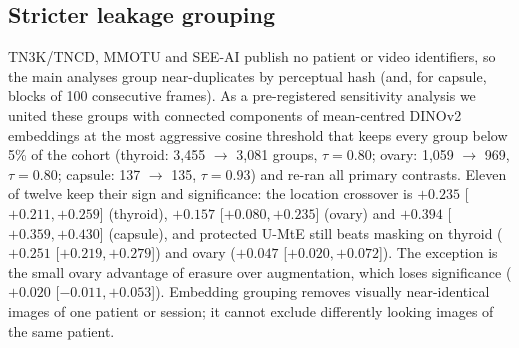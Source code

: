 \subsection{Stricter leakage grouping}\label{sec:leak_emb}
TN3K/TNCD, MMOTU and SEE-AI publish no patient or video identifiers, so the main analyses group near-duplicates by
perceptual hash (and, for capsule, blocks of 100 consecutive frames). As a pre-registered sensitivity analysis we
united these groups with connected components of mean-centred DINOv2 embeddings at the most aggressive cosine
threshold that keeps every group below 5\% of the cohort (thyroid: 3,455 $\to$ 3,081 groups, $\tau=0.80$; ovary:
1,059 $\to$ 969, $\tau=0.80$; capsule: 137 $\to$ 135, $\tau=0.93$) and re-ran all primary contrasts. Eleven of twelve
keep their sign and significance: the location crossover is $+0.235$ [$+0.211, +0.259$] (thyroid), $+0.157$
[$+0.080, +0.235$] (ovary) and $+0.394$ [$+0.359, +0.430$] (capsule), and protected U-MtE still beats masking on
thyroid ($+0.251$ [$+0.219, +0.279$]) and ovary ($+0.047$ [$+0.020, +0.072$]). The exception is the small ovary
advantage of erasure over augmentation, which loses significance ($+0.020$ [$-0.011, +0.053$]). Embedding grouping
removes visually near-identical images of one patient or session; it cannot exclude differently looking images of
the same patient.
